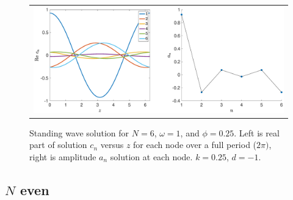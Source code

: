 \documentclass[12pt]{article}
\begin{document}
\begin{figure}[H]
\begin{center}
\begin{tabular}{c}
\includegraphics[width=15cm]{images/twist025.eps}
\end{tabular}
\end{center}
\caption{Standing wave solution for $N = 6$, $\omega = 1$, and $\phi = 0.25$. Left is real part of solution $c_n$ versus $z$ for each node over a full period ($2 \pi)$, right is amplitude $a_n$ solution at each node. $k = 0.25$, $d=-1$.}
\label{fig:twist025}
\end{figure}

\subsection{\texorpdfstring{$N$}{N} even}
\end{document}
